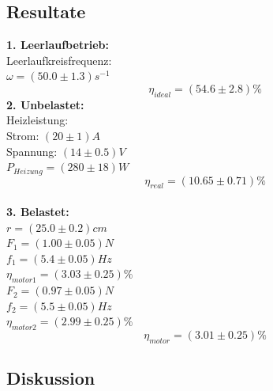 \documentclass[12pt,a4paper]{article}
\begin{document}
\begin{multicols}{2}


\subsection{Resultate}
\textbf{1. Leerlaufbetrieb:}\\
Leerlaufkreisfrequenz:\\
$\omega=(50.0 \pm 1.3)s^{-1}$
$$\eta_{ideal}=(54.6 \pm 2.8)\%$$
\textbf{2. Unbelastet:}\\
Heizleistung:\\
Strom: $(20 \pm 1) A$\\
Spannung: $(14 \pm 0.5) V$\\
$P_{Heizung}=(280 \pm 18)W$\\
$$\eta_{real}=(10.65 \pm 0.71)\%$$\\

%
%
%
%



\noindent \textbf{3. Belastet:}\\
$r = (25.0 \pm 0.2)cm$\\
$F_1 = (1.00 \pm 0.05)N$\\
$f_1 = (5.4 \pm 0.05)Hz$\\
$\eta_{motor1}=(3.03\pm 0.25)\%$\\
$F_2=(0.97\pm 0.05)N$\\
$f_2 = (5.5 \pm 0.05)Hz$\\
$\eta_{motor2}=(2.99\pm 0.25)\%$\\
$$\eta_{motor}=(3.01\pm 0.25)\%$$


\subsection{Diskussion}


\end{multicols}
\end{document}
